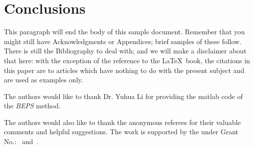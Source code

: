\documentclass[sigconf]{acmart}
\begin{document}
\section{Conclusions}
This paragraph will end the body of this sample document.
Remember that you might still have Acknowledgments or
Appendices; brief samples of these
follow.  There is still the Bibliography to deal with; and
we will make a disclaimer about that here: with the exception
of the reference to the \LaTeX\ book, the citations in
this paper are to articles which have nothing to
do with the present subject and are used as
examples only.

\begin{acks}
	The authors would like to thank Dr. Yuhua Li for providing the
	matlab code of  the \textit{BEPS} method. 
	
	The authors would also like to thank the anonymous referees for
	their valuable comments and helpful suggestions. The work is
	supported by the  under Grant
	No.:~
	and~.
	
\end{acks}



\end{document}

